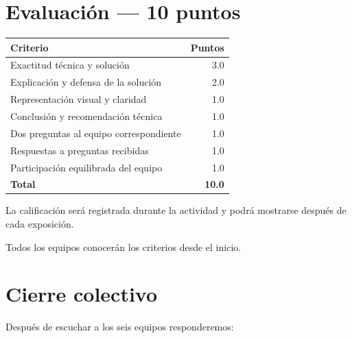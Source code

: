\documentclass[
  spanish,
  letterpaper,
]{scrbook}
\newcounter{none} %
\begin{document}

\chapter{Evaluación --- 10 puntos}\label{evaluaciuxf3n-10-puntos}

{\def\LTcaptype{none} %
\begin{longtable}[]{@{}lr@{}}
\toprule\noalign{}
Criterio & Puntos \\
\midrule\noalign{}
\endhead
\bottomrule\noalign{}
\endlastfoot
Exactitud técnica y solución & 3.0 \\
Explicación y defensa de la solución & 2.0 \\
Representación visual y claridad & 1.0 \\
Conclusión y recomendación técnica & 1.0 \\
Dos preguntas al equipo correspondiente & 1.0 \\
Respuestas a preguntas recibidas & 1.0 \\
Participación equilibrada del equipo & 1.0 \\
\textbf{Total} & \textbf{10.0} \\
\end{longtable}
}

\begin{tcolorbox}[enhanced jigsaw, arc=.35mm, bottomrule=.15mm, bottomtitle=1mm, breakable, colback=white, colbacktitle=quarto-callout-note-color!10!white, colframe=quarto-callout-note-color-frame, coltitle=black, left=2mm, leftrule=.75mm, opacityback=0, opacitybacktitle=0.6, rightrule=.15mm, title=\textcolor{quarto-callout-note-color}{\faInfo}\hspace{0.5em}{Regla de transparencia}, titlerule=0mm, toprule=.15mm, toptitle=1mm]

La calificación será registrada durante la actividad y podrá mostrarse
después de cada exposición.

Todos los equipos conocerán los criterios desde el inicio.

\end{tcolorbox}


\chapter{Cierre colectivo}\label{cierre-colectivo}

Después de escuchar a los seis equipos responderemos:
\end{document}
